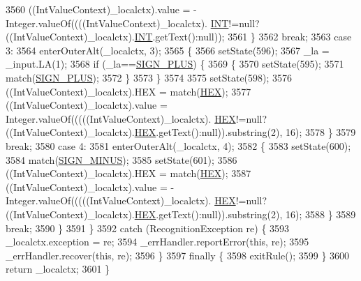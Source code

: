 \begin{DoxyCode}
3560          ((IntValueContext)\_localctx).value =  -Integer.valueOf((((IntValueContext)\_localctx).
      \hyperlink{classgov_1_1nasa_1_1jpf_1_1inspector_1_1client_1_1parser_1_1_console_grammar_parser_abd77a1befc3eca91ef4ffb5856126df5}{INT}!=null?((IntValueContext)\_localctx).\hyperlink{classgov_1_1nasa_1_1jpf_1_1inspector_1_1client_1_1parser_1_1_console_grammar_parser_abd77a1befc3eca91ef4ffb5856126df5}{INT}.getText():null)); 
3561         \}
3562         \textcolor{keywordflow}{break};
3563       \textcolor{keywordflow}{case} 3:
3564         enterOuterAlt(\_localctx, 3);
3565         \{
3566         setState(596);
3567         \_la = \_input.LA(1);
3568         \textcolor{keywordflow}{if} (\_la==\hyperlink{classgov_1_1nasa_1_1jpf_1_1inspector_1_1client_1_1parser_1_1_console_grammar_parser_ac2a6ae73b3b6ce7feef07c1b4866af05}{SIGN\_PLUS}) \{
3569           \{
3570           setState(595);
3571           match(\hyperlink{classgov_1_1nasa_1_1jpf_1_1inspector_1_1client_1_1parser_1_1_console_grammar_parser_ac2a6ae73b3b6ce7feef07c1b4866af05}{SIGN\_PLUS});
3572           \}
3573         \}
3574 
3575         setState(598);
3576         ((IntValueContext)\_localctx).HEX = match(\hyperlink{classgov_1_1nasa_1_1jpf_1_1inspector_1_1client_1_1parser_1_1_console_grammar_parser_a760e1cd3b643e8ee8af5d134b5d438c6}{HEX});
3577          ((IntValueContext)\_localctx).value =   Integer.valueOf(((((IntValueContext)\_localctx).
      \hyperlink{classgov_1_1nasa_1_1jpf_1_1inspector_1_1client_1_1parser_1_1_console_grammar_parser_a760e1cd3b643e8ee8af5d134b5d438c6}{HEX}!=null?((IntValueContext)\_localctx).\hyperlink{classgov_1_1nasa_1_1jpf_1_1inspector_1_1client_1_1parser_1_1_console_grammar_parser_a760e1cd3b643e8ee8af5d134b5d438c6}{HEX}.getText():null)).substring(2), 16); 
3578         \}
3579         \textcolor{keywordflow}{break};
3580       \textcolor{keywordflow}{case} 4:
3581         enterOuterAlt(\_localctx, 4);
3582         \{
3583         setState(600);
3584         match(\hyperlink{classgov_1_1nasa_1_1jpf_1_1inspector_1_1client_1_1parser_1_1_console_grammar_parser_a48b3f6921fee5d663dafe240074dac66}{SIGN\_MINUS});
3585         setState(601);
3586         ((IntValueContext)\_localctx).HEX = match(\hyperlink{classgov_1_1nasa_1_1jpf_1_1inspector_1_1client_1_1parser_1_1_console_grammar_parser_a760e1cd3b643e8ee8af5d134b5d438c6}{HEX});
3587          ((IntValueContext)\_localctx).value =  -Integer.valueOf(((((IntValueContext)\_localctx).
      \hyperlink{classgov_1_1nasa_1_1jpf_1_1inspector_1_1client_1_1parser_1_1_console_grammar_parser_a760e1cd3b643e8ee8af5d134b5d438c6}{HEX}!=null?((IntValueContext)\_localctx).\hyperlink{classgov_1_1nasa_1_1jpf_1_1inspector_1_1client_1_1parser_1_1_console_grammar_parser_a760e1cd3b643e8ee8af5d134b5d438c6}{HEX}.getText():null)).substring(2), 16); 
3588         \}
3589         \textcolor{keywordflow}{break};
3590       \}
3591     \}
3592     \textcolor{keywordflow}{catch} (RecognitionException re) \{
3593       \_localctx.exception = re;
3594       \_errHandler.reportError(\textcolor{keyword}{this}, re);
3595       \_errHandler.recover(\textcolor{keyword}{this}, re);
3596     \}
3597     \textcolor{keywordflow}{finally} \{
3598       exitRule();
3599     \}
3600     \textcolor{keywordflow}{return} \_localctx;
3601   \}
\end{DoxyCode}
